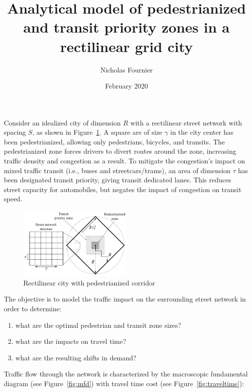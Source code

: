 \documentclass{article}
\title{Analytical model of pedestrianized and transit priority zones in a rectilinear grid city}
\author{Nicholas Fournier}
\date{February 2020}
\begin{document}
\maketitle


Consider an idealized city of dimension $R$ with a rectilinear street network with spacing $S$, as shown in Figure~\ref{fig:gridcity}. A square are of size $\gamma$ in the city center has been pedestrianized, allowing only pedestrians, bicycles, and transits. The pedestrianized zone forces drivers to divert routes around the zone, increasing traffic density and congestion as a result. To mitigate the congestion's impact on mixed traffic transit (i.e., buses and streetcars/trams), an area of dimension $\tau$ has been designated transit priority, giving transit dedicated lanes. This reduces street capacity for automobiles, but negates the impact of congestion on transit speed.

\begin{figure}[!ht]
     \centering
     \includegraphics[width=0.5\textwidth]{diagram_pedtransit_grid_city}
     \caption{Rectilinear city with pedestrianized corridor}
     \label{fig:gridcity}
\end{figure}

\noindent The objective is to model the traffic impact on the surrounding street network in order to determine:
\begin{enumerate}[topsep=3pt, itemsep=3pt, partopsep=3pt, parsep=3pt]
    \itshape
    \item what are the optimal pedestrian and transit zone sizes?
    \item what are the impacts on travel time?
    \item what are the resulting shifts in demand?
\end{enumerate}

\noindent Traffic flow through the network is characterized by the macroscopic fundamental diagram (see Figure~\ref{fig:mfd}) with travel time cost (see Figure~\ref{fig:traveltime}):
\end{document}
